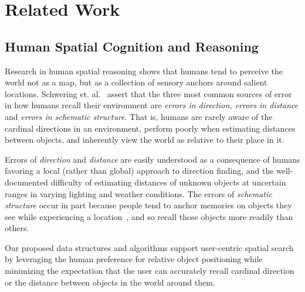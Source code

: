 \section{Related Work}
\label{section:related}


\subsection{Human Spatial Cognition and Reasoning}
\par{Research in human spatial reasoning shows that humans tend to perceive the world not as a map, but as a collection of sensory anchors around salient locations. 
Schwering et. al.~\cite{Schwering2014} assert that the three most common sources of error in how humans recall their environment are \textit{errors in direction, errors in distance} and \textit{errors in schematic structure}.
That is, humans are rarely aware of the cardinal directions in an environment, perform poorly when estimating distances between objects, and inherently view the world as relative to their place in it.}
%
\par{Errors of \textit{direction} and \textit{distance} are easily understood as a consequence of humans favoring a local (rather than global) approach to direction finding, and the well-documented difficulty of estimating distances of unknown objects at uncertain ranges in varying lighting and weather conditions. 
The errors of \textit{schematic structure} occur in part because people tend to anchor memories on objects they see while experiencing a location~\cite{Helbing2020}, and so recall those objects more readily than others.}
% 
\par{Our proposed data structures and algorithms support user-centric spatial search by leveraging the human preference for relative object positioning while minimizing the expectation that the user can accurately recall cardinal direction or the distance between objects in the world around them.}

